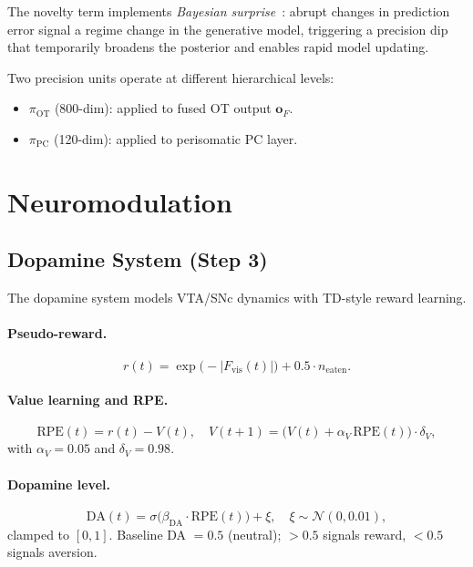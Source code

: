 \documentclass[11pt,a4paper]{article}
\begin{document}
The novelty term implements \emph{Bayesian surprise}~\cite{itti2009}:
abrupt changes in prediction error signal a regime change in the
generative model, triggering a precision dip that temporarily broadens
the posterior and enables rapid model updating.

Two precision units operate at different hierarchical levels:
\begin{itemize}[nosep]
  \item $\pi_\text{OT}$ (800-dim): applied to fused OT output $\mathbf{o}_F$.
  \item $\pi_\text{PC}$ (120-dim): applied to perisomatic PC layer.
\end{itemize}

\section{Neuromodulation}\label{sec:neuromod}

\subsection{Dopamine System (Step 3)}

The dopamine system models VTA/SNc dynamics with TD-style reward learning.

\paragraph{Pseudo-reward.}
\begin{equation}\label{eq:reward}
  r(t) = \exp\!\bigl(-|F_\text{vis}(t)|\bigr) + 0.5 \cdot n_\text{eaten}.
\end{equation}

\paragraph{Value learning and RPE.}
\begin{equation}\label{eq:td}
  \text{RPE}(t) = r(t) - V(t),
  \quad
  V(t{+}1) = \bigl(V(t) + \alpha_V\,\text{RPE}(t)\bigr)\cdot\delta_V,
\end{equation}
with $\alpha_V = 0.05$ and $\delta_V = 0.98$.

\paragraph{Dopamine level.}
\begin{equation}\label{eq:dopa}
  \text{DA}(t) = \sigma\!\bigl(\beta_\text{DA}\cdot\text{RPE}(t)\bigr) + \xi,
  \quad \xi \sim \mathcal{N}(0, 0.01),
\end{equation}
clamped to $[0, 1]$.
Baseline DA $= 0.5$ (neutral); $> 0.5$ signals reward, $< 0.5$ signals
aversion.
\end{document}
